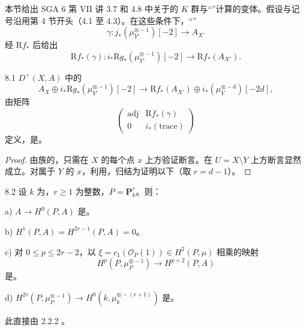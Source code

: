 本节给出 SGA 6 第 VII 讲 3.7 和 4.8 中关于的 $K$ 群与“”计算的变体。假设与记号沿用第 4 节开头（4.1 至 4.3）。在这些条件下，“”
\[
\gamma:j_*(\mu_{Y'}^{\otimes-1})[-2]\longrightarrow A_{X'}
\]
经 $\mathrm Rf_*$ 后给出
\[
\mathrm Rf_*(\gamma):i_*\mathrm Rg_*(\mu_{Y'}^{\otimes-1})[-2]\longrightarrow\mathrm Rf_*(A_{X'}).
\]
\begin{SGAresult}{}{8.1}
$D^+(X,A)$ 中的
\[
 A_X\oplus i_*\mathrm Rg_*(\mu_{Y'}^{\otimes-1})[-2]
 \longrightarrow\mathrm Rf_*(A_{X'})\oplus i_*(\mu_Y^{\otimes-d})[-2d],
 \tag{8.1.1}
\]
由矩阵
\[
\begin{pmatrix}\mathrm{adj}&\mathrm Rf_*(\gamma)\\0&i_*(\mathrm{trace})\end{pmatrix}
\]
定义，是。
\end{SGAresult}
\begin{proof}
由族的，只需在 $X$ 的每个点 $x$ 上方验证断言。在 $U=X\setminus Y$ 上方断言显然成立。对属于 $Y$ 的 $x$，利用，归结为证明以下（取 $r=d-1$）。
\end{proof}
\begin{SGAresult}{}{8.2}
设 $k$ 为，$r\ge1$ 为整数，$P=\mathbf P_k^r$。则：

a)  $A\longrightarrow H^0(P,A)$ 是。

b) $H^1(P,A)=H^{2r-1}(P,A)=0$。

c) 对 $0\le p\le2r-2$，以 $\xi=c_1(\mathscr O_P(1))\in H^2(P,\mu)$ 相乘的映射
\[
 H^p(P,\mu_P^{\otimes-1})\longrightarrow H^{p+2}(P,A)
\]
是。

d)  $H^{2r}(P,\mu_P^{\otimes-1})\longrightarrow H^0(k,\mu_k^{\otimes-(r+1)})$ 是。
\end{SGAresult}
此直接由 2.2.2 。

